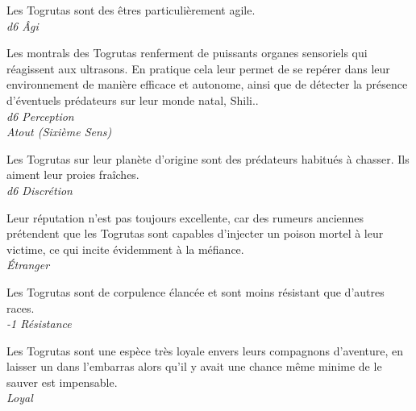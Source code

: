 \begin{description}[align=left]
\item [Agilité] 				%
		Les Togrutas sont des êtres particulièrement agile.\\
		\textit{d6 \^Agi}

\item [Montrals] 				%
		Les montrals des Togrutas renferment de puissants organes sensoriels qui réagissent aux ultrasons. En pratique cela leur permet de se repérer dans leur environnement de manière efficace et autonome, ainsi que de détecter la présence d’éventuels prédateurs sur leur monde natal, Shili..\\
		\textit{d6 Perception}\\
		\textit{Atout (Sixième Sens)}

\item [Prédateur né] 			%
		Les Togrutas sur leur planète d’origine sont des prédateurs habitués à chasser. Ils aiment leur proies fraîches.\\
		\textit{d6 Discrétion}

\item [Mauvaise réputation] 	%
		Leur réputation n’est pas toujours excellente, car des rumeurs anciennes prétendent que les Togrutas sont capables d’injecter un poison mortel à leur victime, ce qui incite évidemment à la méfiance.\\
		\textit{\'Etranger}

\item [Frêle] 					%
		Les Togrutas sont de corpulence élancée et sont moins résistant que d’autres races.\\
		\textit{-1 Résistance}

\item [Un pour tous] 			%
		Les Togrutas sont une espèce très loyale envers leurs compagnons d’aventure, en laisser un dans l’embarras alors qu’il y avait une chance même minime de le sauver est impensable.\\
		\textit{Loyal}
\end{description}